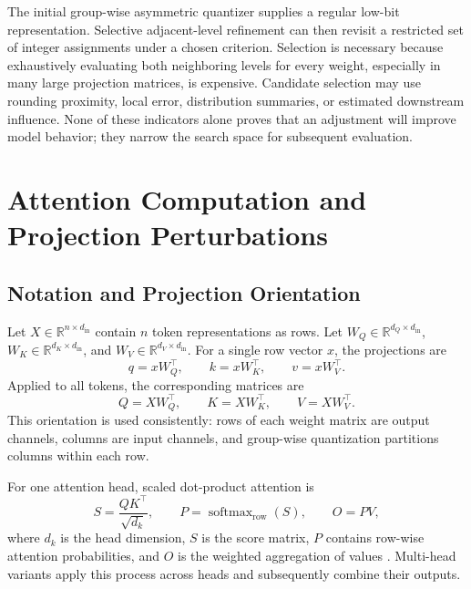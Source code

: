The initial group-wise asymmetric quantizer supplies a regular low-bit representation. Selective adjacent-level refinement can then revisit a restricted set of integer assignments under a chosen criterion. Selection is necessary because exhaustively evaluating both neighboring levels for every weight, especially in many large projection matrices, is expensive. Candidate selection may use rounding proximity, local error, distribution summaries, or estimated downstream influence. None of these indicators alone proves that an adjustment will improve model behavior; they narrow the search space for subsequent evaluation.

\section{Attention Computation and Projection Perturbations}

\subsection{Notation and Projection Orientation}

Let $X\in\mathbb{R}^{n\times d_{\mathrm{in}}}$ contain $n$ token representations as rows. Let
$W_Q\in\mathbb{R}^{d_Q\times d_{\mathrm{in}}}$,
$W_K\in\mathbb{R}^{d_K\times d_{\mathrm{in}}}$, and
$W_V\in\mathbb{R}^{d_V\times d_{\mathrm{in}}}$.
For a single row vector $x$, the projections are
\begin{equation}
q=xW_Q^\top,\qquad
k=xW_K^\top,\qquad
v=xW_V^\top.
\end{equation}
Applied to all tokens, the corresponding matrices are
\begin{equation}
Q=XW_Q^\top,\qquad
K=XW_K^\top,\qquad
V=XW_V^\top.
\end{equation}
This orientation is used consistently: rows of each weight matrix are output channels, columns are input channels, and group-wise quantization partitions columns within each row.

For one attention head, scaled dot-product attention is
\begin{equation}
S=\frac{QK^\top}{\sqrt{d_k}},
\qquad
P=\operatorname{softmax}_{\mathrm{row}}(S),
\qquad
O=PV,
\end{equation}
where $d_k$ is the head dimension, $S$ is the score matrix, $P$ contains row-wise attention probabilities, and $O$ is the weighted aggregation of values \cite{vaswani2017attention}. Multi-head variants apply this process across heads and subsequently combine their outputs.

